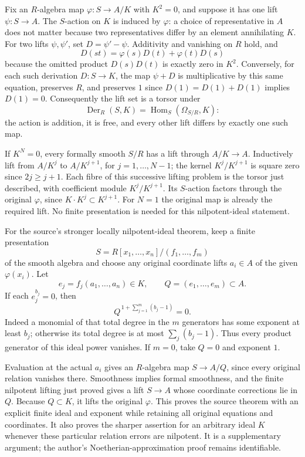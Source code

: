 Fix an \(R\)-algebra map \(\varphi:S\to A/K\) with \(K^2=0\), and suppose it has one lift \(\psi:S\to A\). The \(S\)-action on \(K\) is induced by \(\varphi\): a choice of representative in \(A\) does not matter because two representatives differ by an element annihilating \(K\). For two lifts \(\psi,\psi'\), set \(D=\psi'-\psi\). Additivity and vanishing on \(R\) hold, and \[
D(st)=\varphi(s)D(t)+\varphi(t)D(s)
\] because the omitted product \(D(s)D(t)\) is exactly zero in \(K^2\). Conversely, for each such derivation \(D:S\to K\), the map \(\psi+D\) is multiplicative by this same equation, preserves \(R\), and preserves \(1\) since \(D(1)=D(1)+D(1)\) implies \(D(1)=0\). Consequently the lift set is a torsor under \[
\operatorname{Der}_R(S,K)=\operatorname{Hom}_S(\Omega_{S/R},K):
\] the action is addition, it is free, and every other lift differs by exactly one such map.

If \(K^N=0\), every formally smooth \(S/R\) has a lift through \(A/K\to A\). Inductively lift from \(A/K^j\) to \(A/K^{j+1}\), for \(j=1,\ldots,N-1\); the kernel \(K^j/K^{j+1}\) is square zero since \(2j\ge j+1\). Each fibre of this successive lifting problem is the torsor just described, with coefficient module \(K^j/K^{j+1}\). Its \(S\)-action factors through the original \(\varphi\), since \(K\cdot K^j\subset K^{j+1}\). For \(N=1\) the original map is already the required lift. No finite presentation is needed for this nilpotent-ideal statement.

For the source's stronger locally nilpotent-ideal theorem, keep a finite presentation \[
S=R[x_1,\ldots,x_n]/(f_1,\ldots,f_m)
\] of the smooth algebra and choose any original coordinate lifts \(a_i\in A\) of the given \(\varphi(x_i)\). Let \[
e_j=f_j(a_1,\ldots,a_n)\in K,\qquad Q=(e_1,\ldots,e_m)\subset A.
\] If each \(e_j^{b_j}=0\), then \[
Q^{\,1+\sum_{j=1}^m(b_j-1)}=0.
\] Indeed a monomial of that total degree in the \(m\) generators has some exponent at least \(b_j\); otherwise its total degree is at most \(\sum_j(b_j-1)\). Thus every product generator of this ideal power vanishes. If \(m=0\), take \(Q=0\) and exponent \(1\).

Evaluation at the actual \(a_i\) gives an \(R\)-algebra map \(S\to A/Q\), since every original relation vanishes there. Smoothness implies formal smoothness, and the finite nilpotent lifting just proved gives a lift \(S\to A\) whose coordinate corrections lie in \(Q\). Because \(Q\subset K\), it lifts the original \(\varphi\). This proves the source theorem with an explicit finite ideal and exponent while retaining all original equations and coordinates. It also proves the sharper assertion for an arbitrary ideal \(K\) whenever these particular relation errors are nilpotent. It is a supplementary argument; the author's Noetherian-approximation proof remains identifiable.

